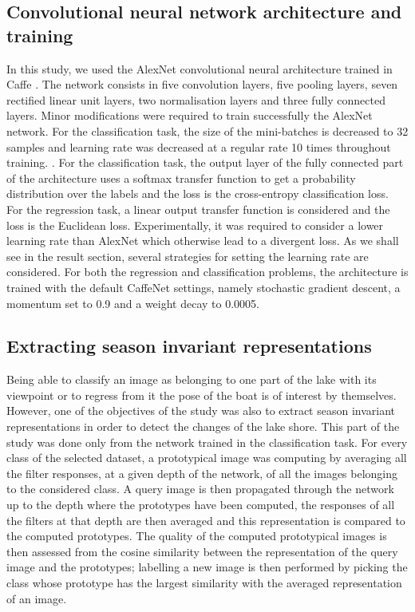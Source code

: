 \subsection{Convolutional neural network architecture and training}

In this study, we used the AlexNet convolutional neural architecture \cite{NIPS2012_4824} trained in Caffe \cite{jia2014caffe}. The network consists in five convolution layers, five pooling layers, seven rectified linear unit layers, two normalisation layers and three fully connected layers. Minor modifications were required to train successfully the AlexNet network. For the classification task, the size of the mini-batches is decreased to 32 samples and learning rate was decreased at a regular rate 10 times throughout training. . For the classification task, the output layer of the fully connected part of the architecture uses a softmax transfer function to get a probability distribution over the labels and the loss is the cross-entropy classification loss. For the regression task, a linear output transfer function is considered and the loss is the Euclidean loss. Experimentally, it was required to consider a lower learning rate than AlexNet which otherwise lead to a divergent loss. As we shall see in the result section, several strategies for setting the learning rate are considered. For both the regression and classification problems, the architecture is trained with the default CaffeNet settings, namely stochastic gradient descent, a momentum set to 0.9 and a weight decay to 0.0005.


\subsection{Extracting season invariant representations}

Being able to classify an image as belonging to one part of the lake with its viewpoint or to regress from it the pose of the boat is of interest by themselves. However, one of the objectives of the study was also to extract season invariant representations in order to detect the changes of the lake shore. This part of the study was done only from the network trained in the classification task. For every class of the selected dataset, a prototypical image was computing by averaging all the filter responses, at a given depth of the network, of all the images belonging to the considered class. A query image is then propagated through the network up to the depth where the prototypes have been computed, the responses of all the filters at that depth are then averaged and this representation is compared to the computed prototypes. The quality of the computed prototypical images is then assessed from the cosine similarity between the representation of the query image and the prototypes; labelling a new image is then performed by picking the class whose prototype has the largest similarity with the averaged representation of an image.
